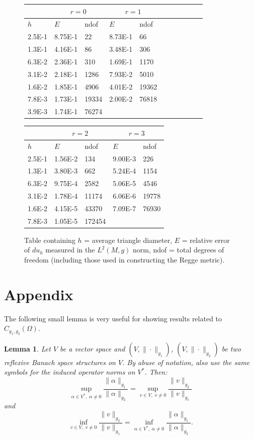 \documentclass[11pt]{article}
\newtheorem{lemma}[theorem]{Lemma}
\begin{document}
\begin{figure}[htp]
\centering
\begin{tabular}{|l|l|l|l|l|l|l|l|l|l|l|}
\hline
	  & \multicolumn{2}{c|}{$r = 0$} & \multicolumn{2}{c|}{$r = 1$}\\
	\hline
	$h$ & $E$ & ndof & $E$ & ndof \\
	\hline
	2.5E-1 & 8.75E-1 &	22  &   8.73E-1 &	66 \\
1.3E-1 & 4.16E-1 &	86 &	3.48E-1 &	306 \\
6.3E-2 & 2.36E-1 &	310 &	1.69E-1 &	1170 \\
3.1E-2 & 2.18E-1 &	1286 &	7.93E-2 &	5010\\
1.6E-2 & 1.85E-1 &	4906&	4.01E-2 &	19362 \\
7.8E-3 & 1.73E-1 &	19334 &	2.00E-2 &	76818 \\
3.9E-3 & 1.74E-1 &	76274 & \multicolumn{2}{c|}{}\\
\hline
\end{tabular}
\begin{tabular}{|l|l|l|l|l|}
\hline
 & \multicolumn{2}{c|}{$r = 2$} & \multicolumn{2}{c|}{$r = 3$} \\
\hline
$h$ & $E$ & ndof & $E$ & ndof  \\
 \hline
 2.5E-1 & 1.56E-2 &	134 &	9.00E-3 &	226 \\
1.3E-1 & 3.80E-3 &	662 &	5.24E-4 &	1154 \\
6.3E-2 & 9.75E-4 &	2582 &	5.06E-5 &	4546 \\
3.1E-2 & 1.78E-4 &	11174 &	6.06E-6 &	19778  \\
1.6E-2 & 4.15E-5 &	43370 &	7.09E-7 &	76930 \\
7.8E-3 & 1.05E-5 &	172454 & \multicolumn{2}{c|}{} \\		
\hline
\end{tabular}
\caption{Table containing $h$ = average triangle diameter, $E$ = relative error of $du_h$ measured in the $L^2(M,g)$ norm, ndof = total degrees of freedom (including those used in constructing the Regge metric).}
\label{tab:convergence}
\end{figure}
\pagebreak

\section{Appendix}
The following small lemma is very useful for showing results related to $C_{g_1,g_2}(\Omega)$.
\begin{lemma}\label{norm_comparison_equiv}
Let $V$ be a vector space and $(V,\|\cdot\|_{g_1})$, $(V,\|\cdot\|_{g_2})$ be two reflexive Banach space structures on $V$. By abuse of notation, also use the same symbols for the induced operator norms on $V^*$. Then:
\begin{equation}
\sup_{\alpha \in V^*, \;\alpha \ne 0} \frac{\|\alpha\|_{g_1}}{\|\alpha\|_{g_2}} = \sup_{v \in V,\;v \ne 0} \frac{\|v\|_{g_2}}{\|v\|_{g_1}} \end{equation}
and
\begin{equation}\inf_{v \in V,\; v \ne 0} \frac{\|v\|_{g_2}}{\|v\|_{g_1}} = \inf_{\alpha \in V^*, \;\alpha \ne 0} \frac{\|\alpha\|_{g_1}}{\|\alpha\|_{g_2}}. \end{equation}
\end{lemma}
\end{document}
